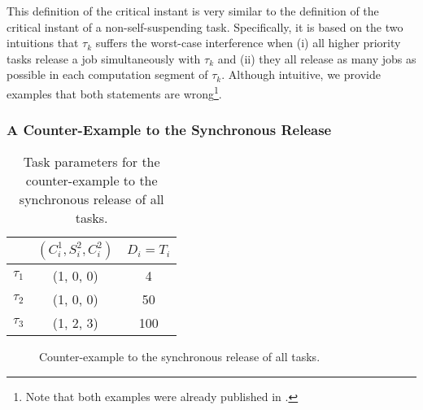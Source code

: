 This definition of the critical instant is very similar to the definition of the critical instant of a non-self-suspending task. Specifically, it is based on the two intuitions that $\tau_k$ suffers the worst-case interference when (i) all higher priority tasks release a job simultaneously with $\tau_k$ and (ii) they all release as many jobs as possible in each computation segment of $\tau_k$. Although intuitive, we provide examples that both statements are wrong\footnote{Note that both examples were already published in \cite{ecrts15nelissen}.}.

\subsubsection{A Counter-Example to the Synchronous Release}

\begin{table} 
\centering
    \begin{tabular}{|c|c|c|}
 \hline
        & $(C_i^1, S_i^2, C_i^2)$ &  $D_i=T_i$\\ 
        \hline
        $\tau_1$ & (1, 0, 0) &  4\\ 
        $\tau_2$ &  (1, 0, 0) & 50  \\ 
        $\tau_3$ & (1, 2, 3) & 100  \\
        \hline
    \end{tabular} 
    \caption{Task parameters for the counter-example to the synchronous release of all tasks.}
    \label{table:ex-synch-releases}
\end{table}

\begin{figure}
  \centering
  \caption{Counter-example to the synchronous release of all tasks.}
  \label{fig:ex-synch-releases}
\end{figure}

